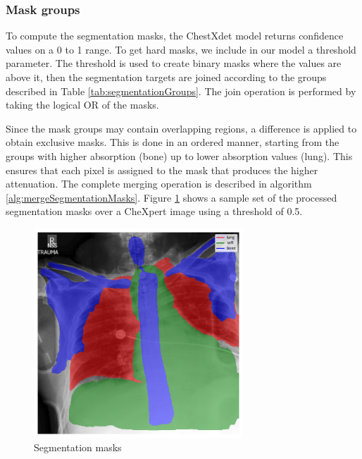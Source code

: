 \documentclass[nomenclature, english, bibtex]{kththesis}
\numberwithin{listing}{chapter}
\begin{document}
\subsubsection{Mask groups}

To compute the segmentation masks, the ChestXdet model returns confidence values on a 0 to 1 range. To get hard masks, we include in our
model a threshold parameter. The threshold is used to create binary masks where the values are above it, then the segmentation targets
are joined according to the groups described in Table \ref{tab:segmentationGroups}. The join operation is performed by taking the logical
OR of the masks.

Since the mask groups may contain overlapping regions, a difference is applied to obtain exclusive masks. This is done in an ordered manner,
starting from the groups with higher absorption (bone) up to lower absorption values (lung). This ensures that each pixel is assigned to
the mask that produces the higher attenuation. The complete merging operation is described in algorithm \ref{alg:mergeSegmentationMasks}. Figure
\ref{fig:segmentationMasks} shows a sample set of the processed segmentation masks over a CheXpert image using a threshold of 0.5. 



\begin{figure}[H]
    \centering
    \includegraphics[width=0.7\textwidth]{figures/segmentation_masks.png}
    \caption{Segmentation masks}
    \label{fig:segmentationMasks}
\end{figure}
\end{document}
